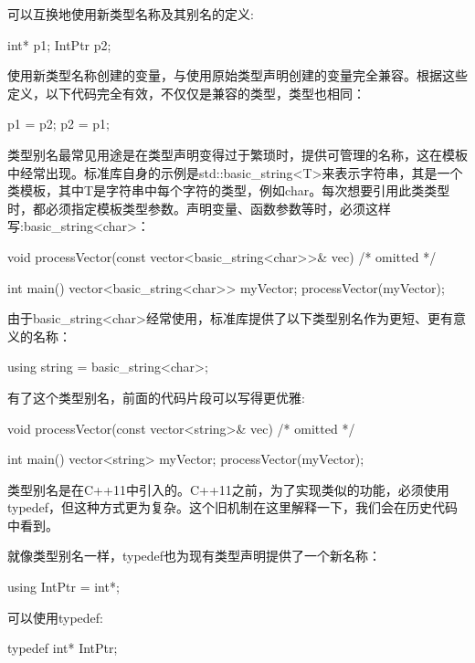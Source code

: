 可以互换地使用新类型名称及其别名的定义:

\begin{cpp}
int* p1;
IntPtr p2;
\end{cpp}

使用新类型名称创建的变量，与使用原始类型声明创建的变量完全兼容。根据这些定义，以下代码完全有效，不仅仅是兼容的类型，类型也相同：

\begin{cpp}
p1 = p2;
p2 = p1;
\end{cpp}

类型别名最常见用途是在类型声明变得过于繁琐时，提供可管理的名称，这在模板中经常出现。标准库自身的示例是std::basic\_string<T>来表示字符串，其是一个类模板，其中T是字符串中每个字符的类型，例如char。每次想要引用此类类型时，都必须指定模板类型参数。声明变量、函数参数等时，必须这样写:basic\_string<char>：

\begin{cpp}
void processVector(const vector<basic_string<char>>& vec) { /* omitted */ }

int main()
{
    vector<basic_string<char>> myVector;
    processVector(myVector);
}
\end{cpp}

由于basic\_string<char>经常使用，标准库提供了以下类型别名作为更短、更有意义的名称：

\begin{cpp}
using string = basic_string<char>;
\end{cpp}

有了这个类型别名，前面的代码片段可以写得更优雅:

\begin{cpp}
void processVector(const vector<string>& vec) { /* omitted */ }

int main()
{
    vector<string> myVector;
    processVector(myVector);
}
\end{cpp}


类型别名是在C++11中引入的。C++11之前，为了实现类似的功能，必须使用typedef，但这种方式更为复杂。这个旧机制在这里解释一下，我们会在历史代码中看到。

就像类型别名一样，typedef也为现有类型声明提供了一个新名称：

\begin{cpp}
using IntPtr = int*;
\end{cpp}

可以使用typedef:

\begin{cpp}
typedef int* IntPtr;
\end{cpp}

